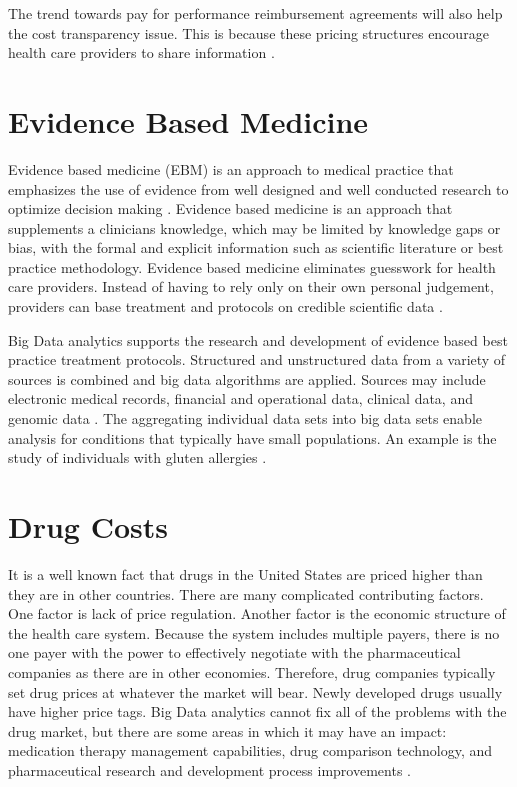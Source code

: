 \documentclass[sigconf]{acmart}
\begin{document}
The trend towards pay for performance reimbursement agreements will also help the cost transparency issue.  This is because these pricing structures encourage health care providers to share information \cite{www-google-christian}. 

\section{Evidence Based Medicine}

Evidence based medicine (EBM) is an approach to medical practice that emphasizes the use of evidence from well designed and well conducted research to optimize decision making \cite{www-google-wikievi}.  Evidence based medicine is an approach that supplements a clinicians knowledge, which may be limited by knowledge gaps or bias, with the formal and explicit information such as scientific literature or best practice methodology. Evidence based medicine eliminates guesswork for health care providers. Instead of having to rely only on their own personal judgement, providers can base treatment and protocols on credible scientific data \cite{www-google-christian}.

Big Data analytics supports the research and development of evidence based best practice treatment protocols.  Structured and unstructured data from a variety of sources is combined and big data algorithms are applied. Sources may include electronic medical records, financial and operational data, clinical data, and genomic data \cite{springer}. The aggregating individual data sets into big data sets enable analysis for conditions that typically have small populations.  An example is the study of individuals with gluten allergies \cite{www-google-McKinsey}.
 
\section{Drug Costs}
It is a well known fact that drugs in the United States are priced higher than they are in other countries.  There are many complicated contributing factors. One factor is lack of price regulation. Another factor is the economic structure of the health care system.  Because the system includes multiple payers, there is no one payer with the power to effectively negotiate with the pharmaceutical companies as there are in other economies. Therefore, drug companies typically set drug prices at whatever the market will bear.  Newly developed drugs usually have higher price tags.  Big Data analytics cannot fix all of the problems with the drug market, but there are some areas in which it may have an impact: medication therapy management capabilities, drug comparison technology, and pharmaceutical research and development process improvements \cite{www-google-drug}.
\end{document}
